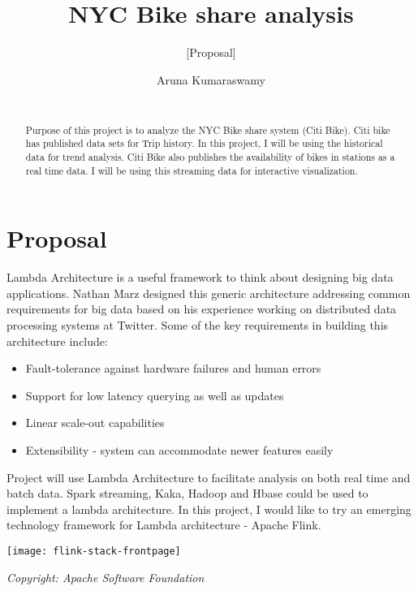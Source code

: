 \documentclass{sig-alternate-05-2015}
\begin{document}
\title{NYC Bike share analysis}
\subtitle{[Proposal]}


\author{
\alignauthor
Aruna Kumaraswamy\\
       \\
}

\maketitle
\begin{abstract}
Purpose of this project is to analyze the NYC Bike share system (Citi Bike).
Citi bike has published data sets for Trip history. In this project, I will be using the historical data for trend analysis.
Citi Bike also publishes the availability of bikes in stations as a real time data. I will be using this streaming data for interactive visualization.
\end{abstract}

\section{Proposal}
\cite{lambda}Lambda Architecture is a useful framework to think about designing big data applications. Nathan Marz designed this generic architecture addressing common requirements for big data based on his experience working on distributed data processing systems at Twitter.
Some of the key requirements in building this architecture include:
\begin{itemize}
    \item Fault-tolerance against hardware failures and human errors
    \item Support for low latency querying as well as updates
    \item Linear scale-out capabilities
    \item Extensibility - system can accommodate newer features easily
\end{itemize}

Project will use Lambda Architecture to facilitate analysis on both real time and batch data. Spark streaming, Kaka, Hadoop and Hbase could be used to implement a lambda architecture. In this project, I would like to try an emerging technology framework for Lambda architecture - Apache Flink. 

\texttt{[image: flink-stack-frontpage]}
\begin{center}\textit{Copyright: Apache Software Foundation}\end{center}
\end{document}
